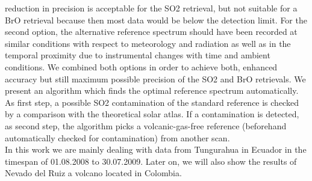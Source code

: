 reduction in precision is acceptable for the SO2 retrieval, but not suitable
for a BrO retrieval because then most data would be below the detection
limit. For the second option, the alternative reference spectrum should
have been recorded at similar conditions with respect to meteorology and
radiation as well as in the temporal proximity due to instrumental changes
with time and ambient conditions. We combined both options in order to
achieve both, enhanced accuracy but still maximum possible precision of
the SO2 and BrO retrievals. We present an algorithm which finds the
optimal reference spectrum automatically. As first step, a possible SO2
contamination of the standard reference is checked by a comparison with
the theoretical solar atlas. If a contamination is detected, as second step,
the algorithm picks a volcanic-gas-free reference (beforehand
automatically checked for contamination) from another scan.\\
%
\newline
%
In this work we are mainly dealing with data from Tungurahua in Ecuador in the timespan of 01.08.2008 to 30.07.2009. Later on, we will also show the results of Nevado del Ruiz a volcano located in Colombia.\\